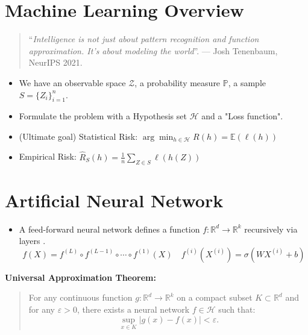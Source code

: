 \documentclass{antclass}
\begin{document}
\section{Machine Learning Overview}
\begin{quote}
	 “\textit{Intelligence is not just about pattern recognition and function approximation. It’s about	modeling the world}”. — Josh Tenenbaum, NeurIPS 2021.
\end{quote}
	\begin{itemize}
		\item We have an observable space \(\mathcal{Z}\), a probability measure \(\mathbb{P}\), a sample \(S=\{Z_i\}_{i=1}^n\).
		\item Formulate the problem with a Hypothesis set \(\mathcal{H}\) and a "Loss function".
		\item (Ultimate goal) Statistical Risk: \(\arg\min_{h\in\mathcal{H}} R(h) = \mathbb{E}(\ell(h))\)
		\item Empirical Risk: \(\hat{R}_S(h) = \frac{1}{n} \sum_{Z \in S} \ell(h(Z))  \)
	\end{itemize}
	
\section{Artificial Neural Network}

	\begin{itemize}
		\item A feed-forward neural network defines a function $f:\mathbb{R}^d\rightarrow \mathbb{R}^k$ recursively via layers .
		\[f(X) = f^{(L)}\circ f^{(L-1)}\circ \cdots \circ f^{(1)}(X) \quad f^{(i)}(X^{(i)})= \sigma(WX^{(i)}+b) \]
	\end{itemize}
	
	\textbf{Universal Approximation Theorem:}
	\begin{quote}
		\small For any continuous function $g:\mathbb{R}^d\rightarrow \mathbb{R}^k$ on a compact subset $K\subset \mathbb{R}^d$ and for any $\varepsilon>0$, there exists a neural network $f\in \mathcal{H}$ such that:
		\[
		\sup_{x\in K} \big|g(x)-f(x)\big| < \varepsilon.
		\]
	\end{quote}
\end{document}
